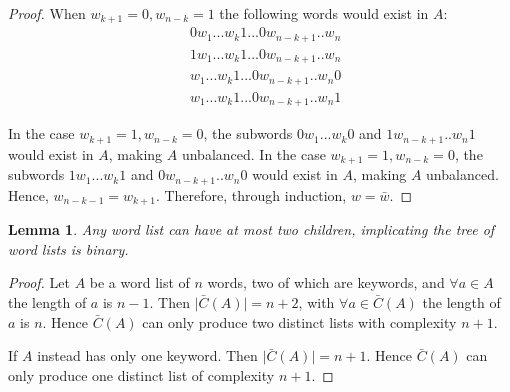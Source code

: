 \documentclass{article}
\newtheorem{lemma}[theorem]{Lemma}
\begin{document}
\begin{proof}
    When $w_{k+1} = 0, w_{n - k} = 1$ the following words would exist in $A$:
    \begin{align*}
        &0w_1...w_k1...0w_{n-k + 1}..w_{n} \\
        &1w_1...w_k1...0w_{n-k + 1}..w_{n} \\
        &w_1...w_k1...0w_{n-k + 1}..w_{n}0 \\
        &w_1...w_k1...0w_{n-k + 1}..w_{n}1 
    \end{align*}

    In the case $w_{k+1} = 1, w_{n - k} = 0$, the subwords $0w_1...w_k0$ and $1w_{n-k + 1}..w_{n}1$ would exist in $A$, making $A$ unbalanced. In the case $w_{k+1} = 1, w_{n - k} = 0$, the subwords $1w_1...w_k1$ and $0w_{n-k + 1}..w_{n}0$ would exist in $A$, making $A$ unbalanced. Hence, $w_{n-k-1} = w_{k+1}$. Therefore, through induction, $w = \bar w$.
\end{proof}



\newpage
\begin{lemma}
Any word list can have at most two children, implicating the tree of word lists is binary.
\end{lemma}
\begin{proof}
    Let $A$ be a word list of $n$ words, two of which are keywords, and $\forall a \in A$ the length of $a$ is $n-1$. Then $\Big | \bar C(A) \Big | =  n + 2$, with  $\forall a \in \bar C (A)$ the length of $a$ is $n$. Hence $\bar C (A)$ can only produce two distinct lists with complexity $n + 1$.

    If $A$ instead has only one keyword. Then $\Big | \bar C(A) \Big | = n + 1$. Hence $\bar C (A)$ can only produce one distinct list of complexity $n + 1$.
\end{proof}
\end{document}
